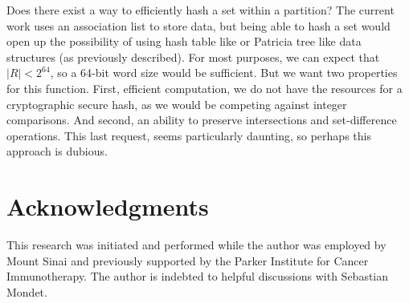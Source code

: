 \documentclass{article}
\begin{document}
Does there exist a way to efficiently hash a set within a partition?
The current work uses an association list to store data, but being able to
hash a set would open up the possibility of using hash table like
or Patricia tree like data structures (as previously
described\cite{Okasaki1998}).
For most purposes,
we can expect that $|R|<2^{64}$,
so a 64-bit word size would be sufficient.
But we want two properties for this function.
First, efficient computation,
we do not have the resources for a cryptographic secure hash,
as we would be competing against integer comparisons.
And second,
an ability to preserve intersections and set-difference operations.
This last request,
seems particularly daunting,
so perhaps this approach is dubious.

\section{Acknowledgments}

This research was initiated and performed while the author was employed by
Mount Sinai and previously supported by the Parker Institute for Cancer
Immunotherapy.
The author is indebted to helpful discussions with Sebastian Mondet.

\clearpage



\end{document}
